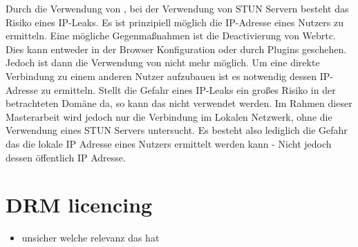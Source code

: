 Durch die Verwendung von \webrtc, bei der Verwendung von STUN Servern besteht das Risiko eines IP-Leaks.\cite{rtcweb-security} Es ist prinzipiell möglich die IP-Adresse eines Nutzers zu ermitteln. Eine mögliche Gegenmaßnahmen ist die Deactivierung von Webrtc. Dies kann entweder in der Browser Konfiguration oder durch Plugins geschehen. Jedoch ist dann die Verwendung von \webrtc nicht mehr möglich. Um eine direkte Verbindung zu einem anderen Nutzer aufzubauen ist es notwendig dessen IP-Adresse zu ermitteln. Stellt die Gefahr eines IP-Leaks ein großes Risiko in der betrachteten Domäne da, so kann das \pTp \cdn nicht verwendet werden. Im Rahmen dieser Masterarbeit wird jedoch nur die Verbindung im Lokalen Netzwerk, ohne die Verwendung eines STUN Servers untersucht. Es besteht also lediglich die Gefahr das die lokale IP Adresse eines Nutzers ermittelt werden kann - Nicht jedoch dessen öffentlich IP Adresse.

\section{DRM licencing}
\begin{itemize}
	\item unsicher welche relevanz das hat
\end{itemize}


